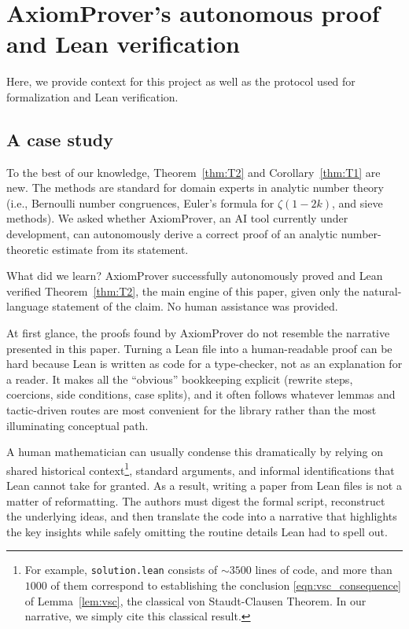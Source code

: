 \documentclass[12pt]{amsart}
\theoremstyle{plain}
\theoremstyle{definition}
\begin{document}
\section{AxiomProver's autonomous proof and Lean verification}\label{Section4}
Here, we provide context for this project as well as the protocol used for
formalization and Lean verification.

\subsection{A case study}
To the best of our knowledge, Theorem~\ref{thm:T2} and Corollary~\ref{thm:T1} are new.
The methods are standard for domain experts in analytic number theory (i.e., Bernoulli number congruences,
Euler's formula for $\zeta(1-2k)$, and sieve methods).
We asked whether AxiomProver, an AI tool currently under development,
can autonomously derive a correct proof of an analytic number-theoretic estimate from its statement.

What did we learn?
AxiomProver successfully autonomously proved and Lean verified Theorem~\ref{thm:T2},
the main engine of this paper, given only the natural-language statement of the claim.
No human assistance was provided.

At first glance, the proofs found by AxiomProver do not resemble the narrative presented in this paper.
Turning a Lean file into a human-readable proof can be hard
because Lean is written as code for a type-checker,
not as an explanation for a reader.
It makes all the “obvious” bookkeeping explicit (rewrite steps, coercions, side conditions, case splits),
and it often follows whatever lemmas and tactic-driven routes are most convenient
for the library rather than the most illuminating conceptual path.

A human mathematician can usually condense this dramatically by
relying on shared historical context\footnote{For example,
  \texttt{solution.lean} consists of $\sim 3500$ lines of code,
  and more than $1000$ of them correspond to establishing the conclusion
  \eqref{eqn:vsc_consequence} of Lemma~\ref{lem:vsc}, the classical von Staudt-Clausen Theorem.
  In our narrative, we simply cite this classical result.},
standard arguments, and informal identifications that Lean cannot take for granted.
As a result, writing a paper from Lean files is not a matter of reformatting.
The authors must digest the formal script, reconstruct the underlying ideas,
and then translate the code into a narrative that highlights the key insights
while safely omitting the routine details Lean had to spell out.
\end{document}
